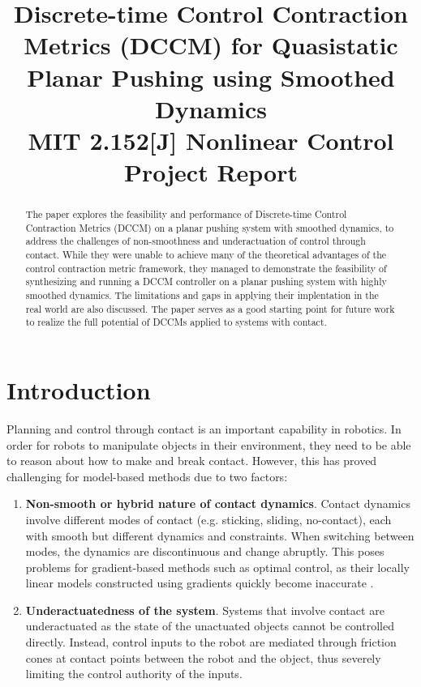 \documentclass[journal]{IEEEtran}
\begin{document}
\title{Discrete-time Control Contraction Metrics (DCCM) for Quasistatic Planar Pushing using Smoothed Dynamics\\
{\footnotesize MIT 2.152[J] Nonlinear Control Project Report}
}

\author{
}

\maketitle

\begin{abstract}
The paper explores the feasibility and performance of Discrete-time Control Contraction Metrics (DCCM) on a planar pushing system with smoothed dynamics, to address the challenges of non-smoothness and underactuation of control through contact. While they were unable to achieve many of the theoretical advantages of the control contraction metric framework, they managed to demonstrate the feasibility of synthesizing and running a DCCM controller on a planar pushing system with highly smoothed dynamics. The limitations and gaps in applying their implentation in the real world are also discussed. The paper serves as a good starting point for future work to realize the full potential of DCCMs applied to systems with contact.
\end{abstract}

\section{Introduction} \label{sec:introduction}
Planning and control through contact is an important capability in robotics. In order for robots to manipulate objects in their environment, they need to be able to reason about how to make and break contact. However, this has proved challenging for model-based methods due to two factors:
\begin{enumerate}
	\item{\bf Non-smooth or hybrid nature of contact dynamics}. Contact dynamics involve different modes of contact (e.g. sticking, sliding, no-contact), each with smooth but different dynamics and constraints. When switching between modes, the dynamics are discontinuous and change abruptly. This poses problems for gradient-based methods such as optimal control, as their locally linear models constructed using gradients quickly become inaccurate \autocite{pangGlobalPlanningContactRich2023}.
	\item{\bf Underactuatedness of the system}. Systems that involve contact are underactuated as the state of the unactuated objects cannot be controlled directly. Instead, control inputs to the robot are mediated through friction cones at contact points between the robot and the object, thus severely limiting the control authority of the inputs.
\end{enumerate}
\end{document}
